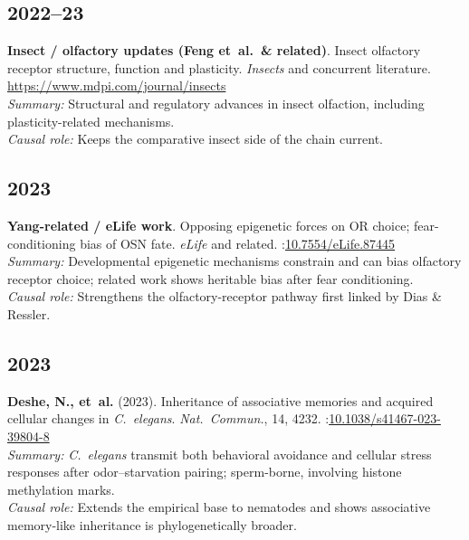 \documentclass[11pt,a4paper]{article}
\begin{document}
\subsection*{2022--23}
\textbf{Insect / olfactory updates (Feng et~al.\ \& related)}. Insect olfactory receptor structure, function and plasticity. \textit{Insects} and concurrent literature.  
\url{https://www.mdpi.com/journal/insects}\\
\textit{Summary:} Structural and regulatory advances in insect olfaction, including plasticity-related mechanisms.\\
\textit{Causal role:} Keeps the comparative insect side of the chain current.

\subsection*{2023}
\textbf{Yang-related / eLife work}. Opposing epigenetic forces on OR choice; fear-conditioning bias of OSN fate. \textit{eLife} and related.  
\doi:\url{10.7554/eLife.87445}\\
\textit{Summary:} Developmental epigenetic mechanisms constrain and can bias olfactory receptor choice; related work shows heritable bias after fear conditioning.\\
\textit{Causal role:} Strengthens the olfactory-receptor pathway first linked by Dias \& Ressler.

\subsection*{2023}
\textbf{Deshe, N., et~al.} (2023). Inheritance of associative memories and acquired cellular changes in \textit{C.\ elegans}. \textit{Nat.\ Commun.}, 14, 4232.  
\doi:\url{10.1038/s41467-023-39804-8}\\
\textit{Summary:} \textit{C.\ elegans} transmit both behavioral avoidance and cellular stress responses after odor--starvation pairing; sperm-borne, involving histone methylation marks.\\
\textit{Causal role:} Extends the empirical base to nematodes and shows associative memory-like inheritance is phylogenetically broader.
\end{document}
